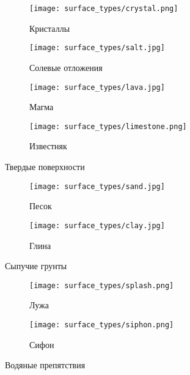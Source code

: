 \begin{figure}[H]
\begin{subfigure}{0.49\textwidth}
\texttt{[image: surface\_types/crystal.png]}\\
\caption{Кристаллы}
\label{fig:crystal}
\end{subfigure}
\begin{subfigure}{0.49\textwidth}
\texttt{[image: surface\_types/salt.jpg]}\\
\caption{Солевые отложения}
\label{fig:salt}
\end{subfigure}

\begin{subfigure}{0.49\textwidth}
\texttt{[image: surface\_types/lava.jpg]}\\
\caption{Магма}
\label{fig:lava}
\end{subfigure}
\begin{subfigure}{0.49\textwidth}
\texttt{[image: surface\_types/limestone.png]}\\
\caption{Известняк}
\label{fig:limestone}
\end{subfigure}
\caption{Твердые поверхности}
\label{fig:solid_surfaces}
\end{figure}

\begin{figure}[H]
\begin{subfigure}{0.49\textwidth}
\texttt{[image: surface\_types/sand.jpg]}\\
\caption{Песок}
\label{fig:sand}
\end{subfigure}
\begin{subfigure}{0.49\textwidth}
\texttt{[image: surface\_types/clay.jpg]}\\
\caption{Глина}
\label{fig:clay}
\end{subfigure}
\caption{Сыпучие грунты}
\label{fig:running_soils}
\end{figure}

\begin{figure}[H]
\begin{subfigure}{0.49\textwidth}
\texttt{[image: surface\_types/splash.png]}\\
\caption{Лужа}
\label{fig:splash}
\end{subfigure}
\begin{subfigure}{0.49\textwidth}
\texttt{[image: surface\_types/siphon.png]}\\
\caption{Сифон}
\label{fig:siphon}
\end{subfigure}
\caption{Водяные препятствия}
\label{fig:water_obstacles}
\end{figure}

